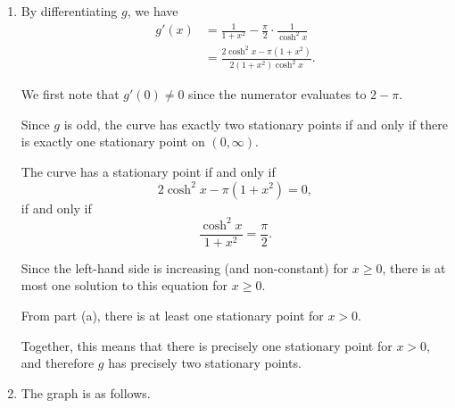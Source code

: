 \begin{enumerate}
\begin{enumerate}
              \item By differentiating \(g\), we have
                    \begin{align*}
                        g'(x) & = \frac{1}{1 + x^2} - \frac{\pi}{2} \cdot \frac{1}{\cosh^2 x}                      \\
                              & = \frac{2 \cosh^2 x - \pi \left(1 + x^2\right)}{2 \left(1 + x^2\right) \cosh^2 x}.
                    \end{align*}

                    We first note that \(g'(0) \neq 0\) since the numerator evaluates to \(2 - \pi\).

                    Since \(g\) is odd, the curve has exactly two stationary points if and only if there is exactly one stationary point on \((0, \infty)\).

                    The curve has a stationary point if and only if
                    \[
                        2 \cosh^2 x - \pi \left(1 + x^2\right) = 0,
                    \]
                    if and only if
                    \[
                        \frac{\cosh^2 x}{1 + x^2} = \frac{\pi}{2}.
                    \]

                    Since the left-hand side is increasing (and non-constant) for \(x \geq 0\), there is at most one solution to this equation for \(x \geq 0\).

                    From part (a), there is at least one stationary point for \(x > 0\).

                    Together, this means that there is precisely one stationary point for \(x > 0\), and therefore \(g\) has precisely two stationary points.

              \item The graph is as follows.
                    \begin{center}
                        
                    \end{center}
          \end{enumerate}
\end{enumerate}